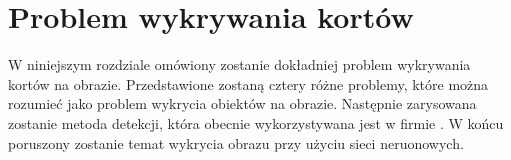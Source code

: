 \chapter{Problem wykrywania kortów}

W niniejszym rozdziale omówiony zostanie dokładniej problem wykrywania kortów na obrazie.
Przedstawione zostaną cztery różne problemy, które można rozumieć jako problem wykrycia obiektów na obrazie.
Następnie zarysowana zostanie metoda detekcji, która obecnie wykorzystywana jest w firmie \blue{}.
W końcu poruszony zostanie temat wykrycia obrazu przy użyciu sieci neruonowych.
